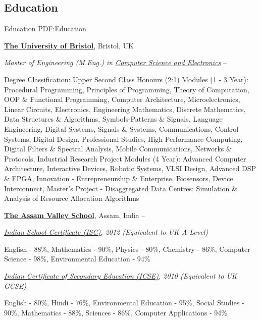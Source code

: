 \documentclass[a4paper,10pt,oneside]{article}
\begin{document}
\begin{body}


\section
{Education}
{Education}
{PDF:Education}

\href{http://www.bristol.ac.uk/}
{\textbf{The University of Bristol}},
Bristol, UK

\EntryGapNoBreak
\textit{Master of Engineering (M.Eng.) in
\href{http://www.bristol.ac.uk/engineering/departments/eeng/}
{Computer Science and Electronics}}
\hfill
{} --
\begin{detail}
\BulletItem
Degree Classification: Upper Second Class Honours (2:1)
\BulletItem
Modules (1 - 3 Year): Procedural Programming, Principles of Programming, Theory of Computation, OOP \& Functional Programming, Computer Architecture, Microelectronics, Linear Circuits, Electronics, Engineering Mathematics, Discrete Mathematics, Data Structures \& Algorithms, Symbols-Patterns \& Signals, Language Engineering, Digital Systems, Signals \& Systems, Communications, Control Systems, Digital Design, Professional Studies, High Performance Computing, Digital Filters \& Spectral Analysis, Mobile Communications, Networks \& Protocols, Industrial Research Project
\BulletItem
Modules (4 Year): Advanced Computer Architecture, Interactive Devices, Robotic Systems, VLSI Design, Advanced DSP \& FPGA, Innovation - Entrepreneurship \& Enterprise, Biosensors, Device Interconnect, Master's Project - Disaggregated Data Centres: Simulation \& Analysis of Resource Allocation Algorithms
\end{detail}

\BigEntryGapNoBreak
\href{http://www.assamvalleyschool.com}
{\textbf{The Assam Valley School}},
Assam, India
\hfill
{} --

\EntryGapNoBreak
\textit{\href{http://www.cisce.org/}
{Indian School Certificate (ISC)},
2012
(Equivalent to UK A-Level)}
\begin{detail}
\BulletItem
English - 88\%, Mathematics - 90\%, Physics - 80\%, Chemistry - 86\%, Computer Science - 98\%, Environmental Education - 94\%
\end{detail}

\EntryGapNoBreak
\textit{\href{http://www.cisce.org/}
{Indian Certificate of Secondary Education (ICSE)},
2010
(Equivalent to UK GCSE)}
\begin{detail}
\BulletItem
English - 80\%, Hindi - 76\%, Environmental Education - 95\%, Social Studies - 90\%, Mathematics - 88\%, Sciences - 86\%, Computer Applications - 94\%
\end{detail}
\vspace{-5pt}
\hline


\end{body}
\end{document}
